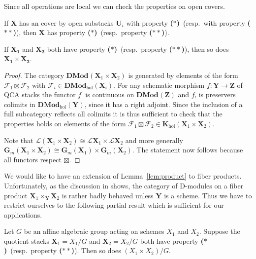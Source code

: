 \documentclass{oupau}
\theoremstyle{remark}
\let\stack\mathbf                           %
\newcommand\cat{\mathbf}                    %
\newcommand\sheaf\mathcal
\newcommand\catDMod[2][]{\cat{DMod}_{#1}(#2)}   %
\newcommand\catDModHol[1]{\catDMod[\mathrm{hol}]{#1}}   %
\newcommand\bc{\textbf{($\mathbf{*}$)}}
\newcommand\hbc{\textbf{($\mathbf{**}$)}}
\newcommand\catK[2][]{\cat{K}_{#1}(#2)}
\newcommand\catKHol[1]{\catK[\mathrm{hol}]{#1}}
\newcommand\ls[1]{\mathcal{L} #1}
\begin{document}
Since all operations are local we can check the properties on open covers.

\begin{lemma}\label{lem:open_cover}
    If $\stack X$ has an cover by open substacks $\stack U_i$ with property \bc\ (resp.~with property \hbc), then $\stack X$ has property \bc\ (resp.~property \hbc).
\end{lemma}

\begin{lemma}\label{lem:product}
    If $\stack{X_1}$ and $\stack{X_2}$ both have property \bc\ (resp.~property \hbc), then so does $\stack{X_1} \times \stack{X_2}$.
\end{lemma}

\begin{proof}
    The category $\catDMod{\stack X_1 \times \stack X_2}$ is generated by elements of the form $\sheaf F_1 \boxtimes \sheaf F_2$ with $\sheaf F_i \in \catDModHol{\stack X_i}$.
    For any schematic morphism $f\colon \stack Y \to \stack Z$ of QCA stacks the functor $f^!$ is continuous on $\catDMod{\stack Z}$ and $f_!$ is preservers colimits in $\catDModHol{\stack Y}$, since it has a right adjoint.
    Since the inclusion of a full subcategory reflects all colimits it is thus sufficient to check that the properties holds on elements of the form $\sheaf F_1 \boxtimes \sheaf F_2 \in \catKHol{\stack X_1 \times \stack X_2}$.
    
    Note that $\ls(\stack X_1 \times \stack X_2) \cong \ls \stack X_1 \times \ls \stack X_2$ and more generally $\stack G_m(\stack X_1 \times \stack X_2) \cong \stack G_m(\stack X_1) \times \stack G_m(\stack X_2)$.
    The statement now follows because all functors respect $\boxtimes$.
\end{proof}

We would like to have an extension of Lemma~\ref{lem:product} to fiber products.
Unfortunately, as the discussion in \cite[Section~1.2]{BenZviNadler:arXiv:CharacterTheoryOfAComplexGroup} shows, the category of D-modules on a fiber product $\stack X_1 \times_{\stack Y} \stack X_2$ is rather badly behaved unless $\stack Y$ is a scheme.
Thus we have to restrict ourselves to the following partial result which is sufficient for our applications.

\begin{lemma}\label{lem:product_quotient}
  Let $G$ be an affine algebraic group acting on schemes $X_1$ and $X_2$.
  Suppose the quotient stacks $\stack X_1 = X_1/G$ and $\stack X_2 = X_2/G$ both have property \bc\ (resp.~property \hbc).
  Then so does $(X_1 \times X_2)/G$.
\end{lemma}
\end{document}
